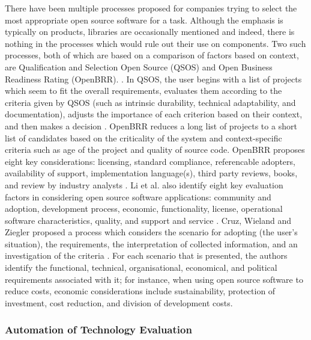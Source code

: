 There have been multiple processes proposed for companies trying to select the most appropriate open source software for a task. Although the emphasis is typically on products, libraries are occasionally mentioned and indeed, there is nothing in the processes which would rule out their use on components. Two such processes, both of which are based on a comparison of factors based on context, are Qualification and Selection Open Source (QSOS) and Open Business Readiness Rating (OpenBRR). \cite{deprez2008comparing}. In QSOS, the user begins with a list of projects which seem to fit the overall requirements, evaluates them according to the criteria given by QSOS (such as intrinsic durability, technical adaptability, and documentation), adjusts the importance of each criterion based on their context, and then makes a decision \cite{semeteys2008method,deprez2008comparing}. OpenBRR reduces a long list of projects to a short list of candidates based on the criticality of the system and context-specific criteria such as age of the project and quality of source code. OpenBRR proposes eight key considerations: licensing, standard compliance, referencable adopters, availability of support, implementation language(s), third party reviews, books, and review by industry analysts \cite{deprez2008comparing}. Li et al. also identify eight key evaluation factors in considering open source software applications: community and adoption, development process, economic, functionality, license, operational software characteristics, quality, and support and service \cite{li2022exploring}. Cruz, Wieland and Ziegler proposed a process which considers the scenario for adopting (the user's situation), the requirements, the interpretation of collected information, and an investigation of the criteria \cite{cruz2006evaluation}. For each scenario that is presented, the authors identify the functional, technical, organisational, economical, and political requirements associated with it; for instance, when using open source software to reduce costs, economic considerations include sustainability, protection of investment, cost reduction, and division of development costs.

\subsubsection{Automation of Technology Evaluation}

